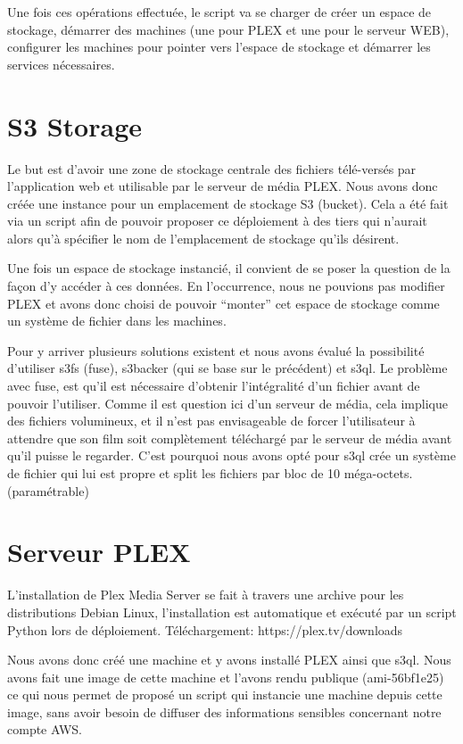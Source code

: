 \documentclass[french]{msereport}
\begin{document}
		Une fois ces opérations effectuée, le script va se charger de créer un espace de stockage, démarrer des machines (une pour PLEX et une pour le serveur WEB), configurer les machines pour pointer vers l’espace de stockage et démarrer les services nécessaires.
	
	\section{S3 Storage }
		Le but est d’avoir une zone de stockage centrale des fichiers télé-versés par l’application web et utilisable par le serveur de média PLEX. Nous avons donc créée une instance pour un emplacement de stockage S3 (bucket). Cela a été fait via un script afin de pouvoir proposer ce déploiement à des tiers qui n’aurait alors qu’à spécifier le nom de l’emplacement de stockage qu’ils désirent.
		
		Une fois un espace de stockage instancié, il convient de se poser la question de la façon d’y accéder à ces données. En l'occurrence, nous ne pouvions pas modifier PLEX et avons donc choisi de pouvoir “monter” cet espace de stockage comme un système de fichier dans les machines.
		
		Pour y arriver plusieurs solutions existent et nous avons évalué la possibilité d'utiliser s3fs (fuse), s3backer (qui se base sur le précédent) et s3ql. Le problème avec fuse, est qu’il est nécessaire d’obtenir l’intégralité d’un fichier avant de pouvoir l’utiliser. Comme il est question ici d’un serveur de média, cela implique des fichiers volumineux, et il n’est pas envisageable de forcer l’utilisateur à attendre que son film soit complètement téléchargé par le serveur de média avant qu’il puisse le regarder. C’est pourquoi nous avons opté pour s3ql crée un système de fichier qui lui est propre et split les fichiers par bloc de 10 méga-octets. (paramétrable)
	
	\section{Serveur PLEX}
		L’installation de Plex Media Server se fait à travers une archive pour les distributions Debian Linux, l’installation est automatique et exécuté par un script Python lors de déploiement.
		Téléchargement: https://plex.tv/downloads
		
		Nous avons donc créé une machine et y avons installé PLEX ainsi que s3ql. Nous avons fait une image de cette machine et l’avons rendu publique (ami-56bf1e25) ce qui nous permet de proposé un script qui instancie une machine depuis cette image, sans avoir besoin de diffuser des informations sensibles concernant notre compte AWS.
		
\end{document}
